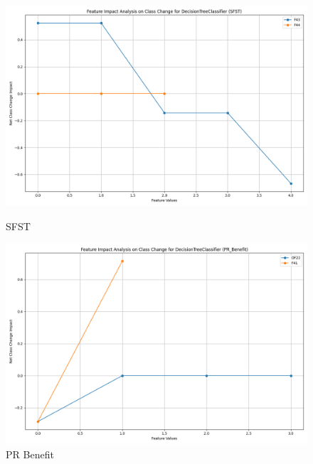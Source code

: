 \begin{figure}[H]
    \centering
    \begin{minipage}{0.495\textwidth}
        \centering
        \includegraphics[width=\linewidth]{analysis/images/feature_impact_class_change_SFST_DecisionTreeClassifier.png}
        \caption{SFST}
        \label{fig:sfst_class_analysis}
    \end{minipage}\hfill
    \begin{minipage}{0.495\textwidth}
        \centering
        \includegraphics[width=\linewidth]{analysis/images/feature_impact_class_change_PR_Benefit_DecisionTreeClassifier.png}
        \caption{PR Benefit}
        \label{fig:pr_ben_class_analysis}
    \end{minipage}
\end{figure}

